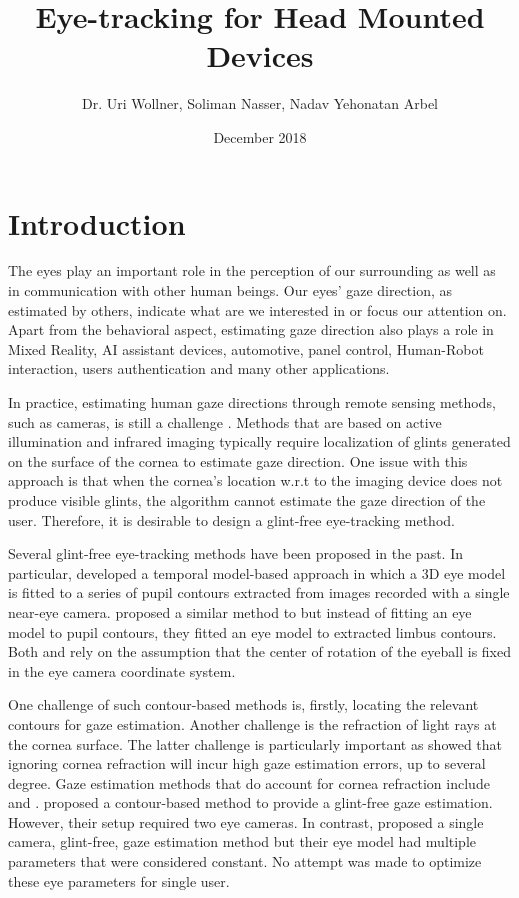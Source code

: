 \documentclass{article}
\title{Eye-tracking for Head Mounted Devices}
\author{Dr. Uri Wollner, Soliman Nasser, Nadav Yehonatan Arbel}
\date{December 2018}
\begin{document}
\maketitle

\section{Introduction}

The eyes play an important role in the perception of our surrounding as well as in communication with other human beings. Our eyes' gaze direction, as estimated by others, indicate what are we interested in or focus our attention on. Apart from the behavioral aspect, estimating gaze direction also plays a role in Mixed Reality, AI assistant devices, automotive, panel control, Human-Robot interaction, users authentication and many other applications. 

In practice, estimating human gaze directions through remote sensing methods, such as cameras, is still a challenge \cite{HansenJi2010}. Methods that are based on active illumination and infrared imaging typically require localization of glints generated on the surface of the cornea to estimate gaze direction. One issue with this approach is that when the cornea's location w.r.t to the imaging device does not produce visible glints, the algorithm cannot estimate the gaze direction of the user. Therefore, it is desirable to design a glint-free eye-tracking method.

Several glint-free eye-tracking methods have been proposed in the past. In particular, \cite{SwirskiDodgson2013} developed a temporal model-based approach in which a 3D eye model is fitted to a series of pupil contours extracted from images recorded with a single near-eye camera.  \cite{LuEtAl2016} proposed a similar method to \cite{SwirskiDodgson2013} but instead of fitting an eye model to pupil contours, they fitted an eye model to extracted limbus contours. Both  \cite{SwirskiDodgson2013} and \cite{LuEtAl2016} rely on the assumption that the center of rotation of the eyeball is fixed in the eye camera coordinate system.

One challenge of such contour-based methods is, firstly, locating the relevant contours for gaze estimation.  Another challenge is the refraction of light rays at the cornea surface. The latter challenge is particularly important as \cite{VillanuevaCabeza2008} showed that ignoring cornea refraction will incur high gaze estimation errors, up to several degree. Gaze estimation methods that do account for cornea refraction include \cite{LaiEtAl2015} and \cite{dierkes18_etra}. \cite{LaiEtAl2015} proposed a contour-based method to provide a glint-free gaze estimation.  However, their setup required two eye cameras. In contrast, \cite{dierkes18_etra} proposed a single camera, glint-free, gaze estimation method but their eye model had multiple parameters that were considered constant. No attempt was made to optimize these eye parameters for single user.
 
\end{document}
